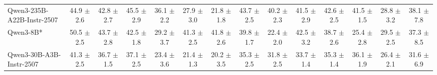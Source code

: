\documentclass{llmxive}
\begin{document}
\begin{table}[hbt]
{\begin{tabular}{l *{13}{c}}
Qwen3-235B-A22B-Instr-2507 &
44.9 {\tiny$\pm$ 2.6} &
42.8 {\tiny$\pm$ 2.7} &
45.5 {\tiny$\pm$ 2.9} &
36.1 {\tiny$\pm$ 2.2} &
27.9 {\tiny$\pm$ 3.0} &
21.8 {\tiny$\pm$ 1.8} &
43.7 {\tiny$\pm$ 2.5} &
40.2 {\tiny$\pm$ 2.3} &
41.5 {\tiny$\pm$ 2.9} &
42.6 {\tiny$\pm$ 2.5} &
41.5 {\tiny$\pm$ 1.5} &
28.8 {\tiny$\pm$ 3.2} &
38.1 {\tiny$\pm$ 7.8} \\

\rowcolor{gray!10}
Qwen3-8B* &
50.5 {\tiny$\pm$ 2.5} &
43.7 {\tiny$\pm$ 2.8} &
42.5 {\tiny$\pm$ 1.8} &
29.2 {\tiny$\pm$ 3.7} &
41.3 {\tiny$\pm$ 2.5} &
41.8 {\tiny$\pm$ 2.6} &
39.8 {\tiny$\pm$ 1.7} &
22.4 {\tiny$\pm$ 2.0} &
42.5 {\tiny$\pm$ 3.2} &
38.7 {\tiny$\pm$ 2.6} &
25.4 {\tiny$\pm$ 2.8} &
29.5 {\tiny$\pm$ 2.5} &
37.3 {\tiny$\pm$ 8.5} \\




Qwen3-30B-A3B-Instr-2507 &
41.3 {\tiny$\pm$ 2.5} &
36.7 {\tiny$\pm$ 1.5} &
37.1 {\tiny$\pm$ 2.5} &
23.4 {\tiny$\pm$ 3.6} &
21.4 {\tiny$\pm$ 1.3} &
20.2 {\tiny$\pm$ 3.5} &
35.3 {\tiny$\pm$ 2.5} &
31.8 {\tiny$\pm$ 2.5} &
33.7 {\tiny$\pm$ 1.4} &
35.3 {\tiny$\pm$ 1.4} &
36.1 {\tiny$\pm$ 1.9} &
26.4 {\tiny$\pm$ 2.1} &
31.6 {\tiny$\pm$ 6.9} \\


\end{tabular}}
\end{table}
\end{document}
